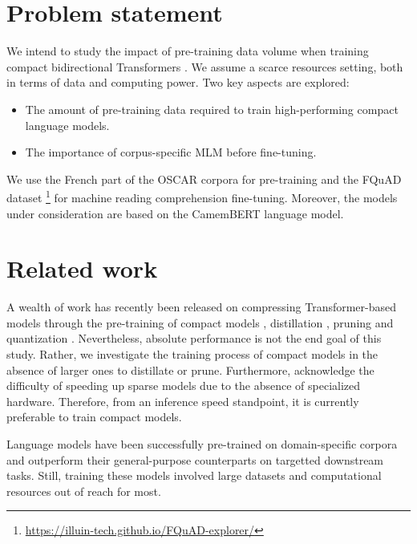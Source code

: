 \documentclass[11pt,a4paper]{article}
\begin{document}
\section{Problem statement}
We intend to study the impact of pre-training data volume when training compact bidirectional Transformers \citep{bert}. We assume a scarce resources setting, both in terms of data and computing power. Two key aspects are explored:

\begin{itemize}
    \item The amount of pre-training data required to train high-performing compact language models.
    \item The importance of corpus-specific MLM before fine-tuning.
\end{itemize}

We use the French part of the OSCAR corpora \citep{oscar} for pre-training and the FQuAD dataset \footnote{\url{https://illuin-tech.github.io/FQuAD-explorer/}} \citep{fquad} for machine reading comprehension fine-tuning. Moreover, the models under consideration are based on the CamemBERT \citep{camembert} language model.

\section{Related work}

A wealth of work has recently been released \citep{survey} on compressing Transformer-based models \citep{attention, bert} through the pre-training of compact models \citep{wellread}, distillation \citep{distillation, tinybert, mobilebert}, pruning \citep{trainthencompress, structuredpruning, movementpruning, dropoutpruning} and quantization \citep{qbert, quantnoise}. Nevertheless, absolute performance is not the end goal of this study. Rather, we investigate the training process of compact models in the absence of larger ones to distillate or prune. Furthermore, \citet{movementpruning} acknowledge the difficulty of speeding up sparse models due to the absence of specialized hardware. Therefore, from an inference speed standpoint, it is currently preferable to train compact models.

Language models have been successfully pre-trained on domain-specific corpora \citep{scibert, biobert} and outperform their general-purpose counterparts on targetted downstream tasks. Still, training these models involved large datasets and computational resources out of reach for most.
\end{document}
